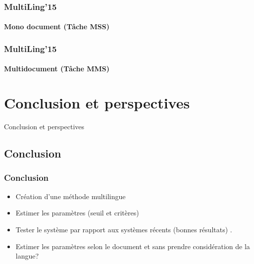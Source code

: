 \documentclass{beamer}
\begin{document}
\begin{frame}
\frametitle{MultiLing'15}
\framesubtitle{Mono document (Tâche MSS)}
\begin{center}
\footnotesize

\end{center}
\end{frame}

\begin{frame}
\frametitle{MultiLing'15}
\framesubtitle{Multidocument (Tâche MMS)}
\begin{center}
\footnotesize

\end{center}
\end{frame}


\section{Conclusion et perspectives}
\begin{frame}
\begin{center}
{\Huge Conclusion et perspectives}
\end{center}
\end{frame}

\subsection{Conclusion}
\begin{frame}
\frametitle{Conclusion}
\begin{itemize}
\item Création d'une méthode multilingue
\item Estimer les paramètres (seuil et critères)
\item Tester le système par rapport aux systèmes récents (bonnes résultats) \cite{15-aries-al}.
\item Estimer les paramètres selon le document et sans prendre considération de la langue?
\end{itemize}
\end{frame}
\end{document}
